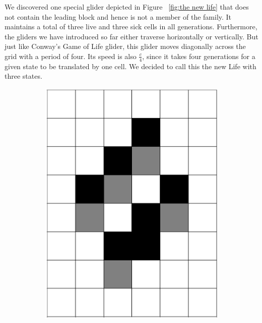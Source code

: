 \documentclass[12pt]{article}
\numberwithin{figure}{section} %
\begin{document}
We discovered one special glider depicted in Figure ~\ref{fig:the new life} that does not contain the leading block and hence is not a member of the family. It maintains a total of three live and three sick cells in all generations. Furthermore, the gliders we have introduced so far either traverse horizontally or vertically. But just like Conway’s Game of Life glider, this glider moves diagonally across the grid with a period of four. Its speed is also $\frac{c}{4}$, since it takes four generations for a given state to be translated by one cell. We decided to call this the new Life with three states.
\begin{figure}[H]
	\begin{subfigure}{0.16\textwidth}
     		\centering
     		\includegraphics[width=\linewidth]{Section4/21.0}
     		\subcaption{}
   	\end{subfigure}
     	\begin{subfigure}{0.16\textwidth}
     		\centering

\end{subfigure}
\end{figure}
\end{document}
